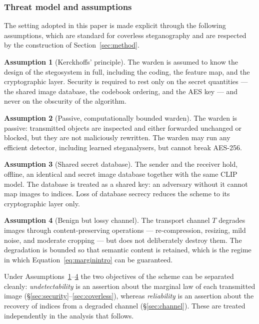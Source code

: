 \documentclass[10pt,a4paper]{article}
\theoremstyle{definition}
\newtheorem{assumption}{Assumption}[section]
\begin{document}
\subsubsection{Threat model and assumptions}\label{sec:threat}
The setting adopted in this paper is made explicit through the following
assumptions, which are standard for coverless steganography and are respected by
the construction of Section~\ref{sec:method}.

\begin{assumption}[Kerckhoffs' principle]\label{as:kerckhoffs}
The warden is assumed to know the design of the stegosystem in full, including the
coding, the feature map, and the cryptographic layer. Security is required to rest
only on the secret quantities --- the shared image database, the codebook ordering,
and the AES key --- and never on the obscurity of the algorithm.
\end{assumption}

\begin{assumption}[Passive, computationally bounded warden]\label{as:warden}
The warden is passive: transmitted objects are inspected and either forwarded
unchanged or blocked, but they are not maliciously rewritten. The warden may run
any efficient detector, including learned steganalysers, but cannot break AES-256.
\end{assumption}

\begin{assumption}[Shared secret database]\label{as:db}
The sender and the receiver hold, offline, an identical and secret image database
together with the same CLIP model. The database is treated as a shared key: an
adversary without it cannot map images to indices. Loss of database secrecy reduces
the scheme to its cryptographic layer only.
\end{assumption}

\begin{assumption}[Benign but lossy channel]\label{as:channel}
The transport channel $T$ degrades images through content-preserving operations
--- re-compression, resizing, mild noise, and moderate cropping --- but does not
deliberately destroy them. The degradation is bounded so that semantic content is
retained, which is the regime in which Equation~\eqref{eq:marginintro} can be guaranteed.
\end{assumption}

Under Assumptions~\ref{as:kerckhoffs}--\ref{as:channel} the two objectives of the
scheme can be separated cleanly: \emph{undetectability} is an assertion about the
marginal law of each transmitted image (\S\ref{sec:security}--\ref{sec:coverless}),
whereas \emph{reliability} is an assertion about the recovery of indices from a
degraded channel (\S\ref{sec:channel}). These are treated independently in the
analysis that follows.
\end{document}
